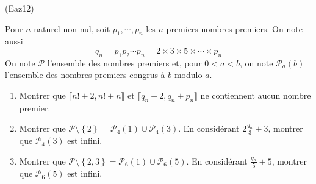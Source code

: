 \begin{tiny}(Eaz12)\end{tiny} Pour $n$ naturel non nul, soit $p_1, \cdots, p_n$ les $n$ premiers nombres premiers. On note aussi
\begin{displaymath}
  q_n = p_1p_2 \cdots p_n=2\times 3 \times 5 \times \cdots \times p_n
\end{displaymath}
On note $\mathcal{P}$ l'ensemble des nombres premiers et, pour $0<a<b$, on note $\mathcal{P}_a(b)$ l'ensemble des nombres premiers congrus à $b$ modulo $a$.
\begin{enumerate}
  \item Montrer que $\llbracket n! + 2, n! + n \rrbracket$ et $\llbracket q_n + 2 , q_n + p_n \rrbracket$ ne contiennent aucun nombre premier.
  \item Montrer que $\mathcal{P}\setminus\left\lbrace 2 \right\rbrace = \mathcal{P}_4(1) \cup \mathcal{P}_4(3)$. En considérant $2\frac{q_n}{3}+3$, montrer que $\mathcal{P}_4(3)$ est infini.
  \item Montrer que $\mathcal{P}\setminus\left\lbrace  2, 3\right\rbrace = \mathcal{P}_6(1) \cup \mathcal{P}_6(5)$. En considérant $\frac{q_n}{5}+5$, montrer que $\mathcal{P}_6(5)$ est infini.
\end{enumerate}
